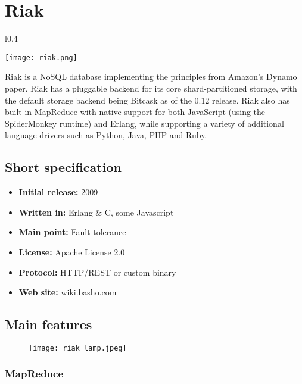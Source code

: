 \chapter{Riak}

\begin{wrapfigure}{l}{0.4\textwidth}
  \vspace{-75pt}
  \begin{center}
    \texttt{[image: riak.png]}
  \end{center}
  \vspace{-30pt}
\end{wrapfigure}
Riak is a NoSQL database implementing the principles from Amazon's Dynamo paper.
Riak has a pluggable backend for its core shard-partitioned storage, with the default storage backend being Bitcask as of the 0.12 release. Riak also has built-in MapReduce with native support for both JavaScript (using the SpiderMonkey runtime) and Erlang, while supporting a variety of additional language drivers such as Python, Java, PHP and Ruby.

\section{Short specification}

\begin{itemize}
  \item \textbf{Initial release:} 2009
  \item \textbf{Written in:} Erlang \& C, some Javascript
  \item \textbf{Main point:} Fault tolerance
  \item \textbf{License:} Apache License 2.0
  \item \textbf{Protocol:} HTTP/REST or custom binary
  \item \textbf{Web site:} \href{http://wiki.basho.com/}{wiki.basho.com}
\end{itemize}

\section{Main features}

\begin{figure}[hb]
  \centering
  \texttt{[image: riak\_lamp.jpeg]}
\end{figure}

\subsection{MapReduce}


